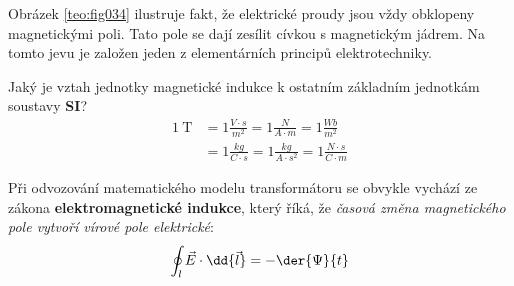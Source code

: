 
    Obrázek \ref{teo:fig034} ilustruje fakt, že elektrické proudy jsou vždy obklopeny 
    magnetickými poli. Tato pole se dají zesílit cívkou s magnetickým jádrem. Na tomto jevu je 
    založen jeden z elementárních principů elektrotechniky.    
       
    \begin{tcnote}
      Jaký je vztah jednotky magnetické indukce k ostatním základním jednotkám soustavy \textbf{SI}? 
      \begin{align*}
        \qty{1}{\tesla}
          &= 1\frac{V\cdot s}{m^2} = 1\frac{N}{A\cdot m} = 1\frac{Wb}{m^2}          \\
          &= 1\frac{kg}{C\cdot s} = 1\frac{kg}{A\cdot s^2} = 1\frac{N\cdot s}{C \cdot m}
      \end{align*}
    \end{tcnote}
    
    Při odvozování matematického modelu transformátoru se obvykle vychází ze zákona 
    \textbf{elektromagnetické indukce}, který říká, že \emph{časová změna magnetického pole vytvoří 
    vírové pole elektrické}:
    \begin{equation}\label{es:eq_ind_z}
      \oint_l \vec{E} \cdot \dd{\vec{l}} = - \der{\Psi}{t}
    \end{equation}
     
